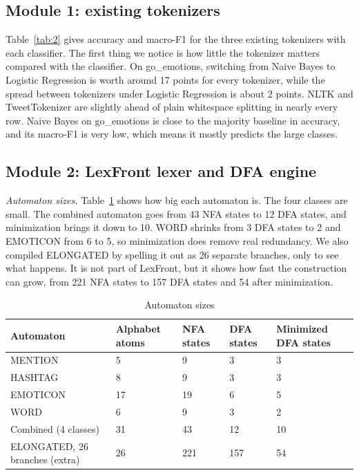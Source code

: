 \documentclass[journal,onecolumn,12pt,a4paper]{IEEEtran}
\begin{document}
\subsection{Module 1: existing tokenizers}\label{sec:4.2}
Table~\ref{tab:2} gives accuracy and macro-F1 for the three existing tokenizers with each classifier. The first thing we notice is how little the tokenizer matters compared with the classifier. On go\_emotions, switching from Naive Bayes to Logistic Regression is worth around 17 points for every tokenizer, while the spread between tokenizers under Logistic Regression is about 2 points. NLTK and TweetTokenizer are slightly ahead of plain whitespace splitting in nearly every row. Naive Bayes on go\_emotions is close to the majority baseline in accuracy, and its macro-F1 is very low, which means it mostly predicts the large classes.

\subsection{Module 2: LexFront lexer and DFA engine}\label{sec:4.3}
\par\noindent\textit{Automaton sizes.}
Table~\ref{tab:3} shows how big each automaton is. The four classes are small. The combined automaton goes from 43 NFA states to 12 DFA states, and minimization brings it down to 10. WORD shrinks from 3 DFA states to 2 and EMOTICON from 6 to 5, so minimization does remove real redundancy. We also compiled ELONGATED by spelling it out as 26 separate branches, only to see what happens. It is not part of LexFront, but it shows how fast the construction can grow, from 221 NFA states to 157 DFA states and 54 after minimization.

\begin{table}[!tb]
\caption{Automaton sizes}\label{tab:3}
\centering
\footnotesize
\setlength{\tabcolsep}{4pt}
\begin{tabular}{lllll}
\toprule
\textbf{Automaton} & \textbf{Alphabet atoms} & \textbf{NFA states} & \textbf{DFA states} & \textbf{Minimized DFA states} \\
\midrule
MENTION & 5 & 9 & 3 & 3 \\
HASHTAG & 8 & 9 & 3 & 3 \\
EMOTICON & 17 & 19 & 6 & 5 \\
WORD & 6 & 9 & 3 & 2 \\
Combined (4 classes) & 31 & 43 & 12 & 10 \\
ELONGATED, 26 branches (extra) & 26 & 221 & 157 & 54 \\
\bottomrule
\end{tabular}
\end{table}
\end{document}
